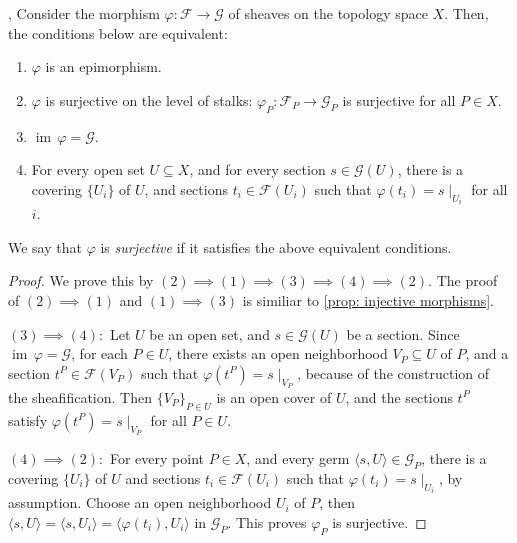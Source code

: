 \documentclass[11pt]{article}
\begin{document}
\begin{proposition}
    \label{prop: surjective morphisms}
    \cite[2.4 O]{vakilTheRisingSea}, \cite[Ex 1.3]{hartsAG} 
    Consider the morphism $\varphi:\mathscr{F} \to \mathscr{G}$ of sheaves 
    on the topology space $X$. 
    Then, the conditions below are equivalent: 
    \begin{enumerate}[label = (\arabic*)]
        \item $\varphi$ is an epimorphism. 
        \item $\varphi$ is surjective on the level of stalks: 
        $\varphi_{P}:\mathscr{F}_{P}\to \mathscr{G}_{P}$ is surjective for all $P \in X$. 
    
        \item $\operatorname{im}\,\varphi = \mathscr{G}$. 
        \item For every open set $ U \subseteq X $, 
        and for every section $ s \in \mathscr{G}(U) $, 
        there is a covering $ \{U_{i}\} $ of $ U $, 
        and sections $ t_{i} \in \mathscr{F}(U_{i}) $ 
        such that $ \varphi(t_{i})=s\mid_{U_{i}} $ for all $ i $. 
    \end{enumerate}

    We say that $\varphi$ is \emph{surjective} 
    if it satisfies the above equivalent conditions.
\end{proposition}

\begin{proof}
We prove this by $ (2) \implies (1) \implies (3) \implies (4) \implies (2) $. 
The proof of $ (2) \implies (1) $ and $ (1) \implies (3) $ is similiar to \autoref{prop: injective morphisms}. 

$ (3) \implies (4): $ Let $ U $ be an open set, and $ s \in \mathscr{G}(U) $ be a section. 
Since $ \operatorname{im}\,\varphi = \mathscr{G} $, for each $ P \in U $, 
there exists an open neighborhood $ V_{P} \subseteq U $ of $ P $, and a section 
$ t^{P} \in \mathscr{F}(V_{P}) $ such that $ \varphi(t^{P}) = s\mid_{V_{P}} $, 
because of the construction of the sheafification. 
Then $ \{V_{P}\}_{P \in U} $ is an open cover of $ U $, and the sections $ t^{P} $ satisfy 
$ \varphi(t^{P}) = s\mid_{V_{P}} $ for all $ P \in U $. 

$ (4) \implies (2): $ For every point $ P \in X $, and every germ 
$ \langle s, U \rangle \in \mathscr{G}_{P} $, there is a covering $ \{U_{i}\} $ of $ U $ and sections 
$ t_{i} \in \mathscr{F}(U_{i}) $ such that $ \varphi(t_{i})=s \mid_{U_{i}} $, by assumption. 
Choose an open neighborhood $ U_{i} $ of $ P $, then 
$ \langle s,U \rangle = \langle s,U_{i} \rangle =  \langle \varphi(t_{i}),U_{i} \rangle $ 
in $ \mathscr{G}_{P} $. This proves $ \varphi_{P} $ is surjective. 
\end{proof}
\end{document}
